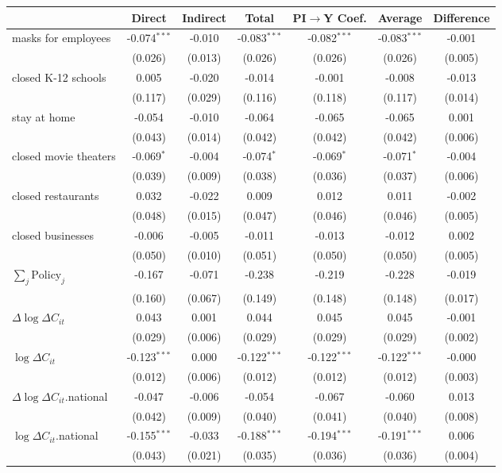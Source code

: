 
\begin{tabular}{lccccc|>{}c}
\toprule
  & Direct & Indirect & Total & PI$\to$Y Coef. & Average & Difference\\
\midrule
masks for employees & -0.074$^{***}$ & -0.010 & -0.083$^{***}$ & -0.082$^{***}$ & -0.083$^{***}$ & -0.001\\
 & (0.026) & (0.013) & (0.026) & (0.026) & (0.026) & (0.005)\\
closed K-12 schools & 0.005 & -0.020 & -0.014 & -0.001 & -0.008 & -0.013\\
 & (0.117) & (0.029) & (0.116) & (0.118) & (0.117) & (0.014)\\
stay at home & -0.054 & -0.010 & -0.064 & -0.065 & -0.065 & 0.001\\
 & (0.043) & (0.014) & (0.042) & (0.042) & (0.042) & (0.006)\\
closed movie theaters & -0.069$^{*}$ & -0.004 & -0.074$^{*}$ & -0.069$^{*}$ & -0.071$^{*}$ & -0.004\\
 & (0.039) & (0.009) & (0.038) & (0.036) & (0.037) & (0.006)\\
closed restaurants & 0.032 & -0.022 & 0.009 & 0.012 & 0.011 & -0.002\\
 & (0.048) & (0.015) & (0.047) & (0.046) & (0.046) & (0.005)\\
closed businesses & -0.006 & -0.005 & -0.011 & -0.013 & -0.012 & 0.002\\
 & (0.050) & (0.010) & (0.051) & (0.050) & (0.050) & (0.005)\\
$\sum_j \mathrm{Policy}_j$ & -0.167 & -0.071 & -0.238 & -0.219 & -0.228 & -0.019\\
 & (0.160) & (0.067) & (0.149) & (0.148) & (0.148) & (0.017)\\
$\Delta \log \Delta C_{it}$ & 0.043 & 0.001 & 0.044 & 0.045 & 0.045 & -0.001\\
 & (0.029) & (0.006) & (0.029) & (0.029) & (0.029) & (0.002)\\
$\log \Delta C_{it}$ & -0.123$^{***}$ & 0.000 & -0.122$^{***}$ & -0.122$^{***}$ & -0.122$^{***}$ & -0.000\\
 & (0.012) & (0.006) & (0.012) & (0.012) & (0.012) & (0.003)\\
$\Delta \log \Delta C_{it}$.national & -0.047 & -0.006 & -0.054 & -0.067 & -0.060 & 0.013\\
 & (0.042) & (0.009) & (0.040) & (0.041) & (0.040) & (0.008)\\
$\log \Delta C_{it}$.national & -0.155$^{***}$ & -0.033 & -0.188$^{***}$ & -0.194$^{***}$ & -0.191$^{***}$ & 0.006\\
 & (0.043) & (0.021) & (0.035) & (0.036) & (0.036) & (0.004)\\
\bottomrule
\end{tabular}